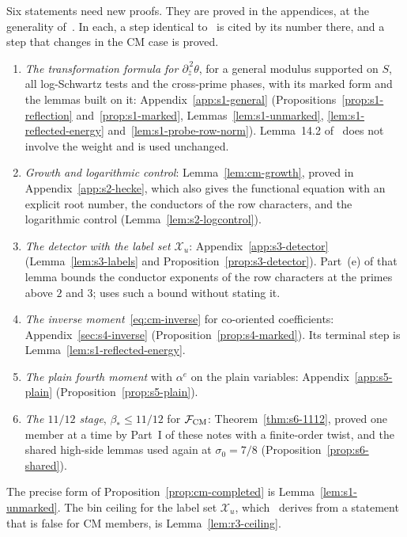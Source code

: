 \documentclass[11pt]{article}
\numberwithin{equation}{section}
\begin{document}
Six statements need new proofs. They are proved in the appendices, at the generality of~\cite{OAI78}. In each, a step identical to~\cite{OAI78} is cited by its number there, and a
step that changes in the CM case is proved.
\begin{enumerate}
\item \emph{The transformation formula for $\partial_{\bar z}^{\,2}\theta$}, for a general modulus supported on $S$,
 all log-Schwartz tests and the cross-prime phases, with its marked form and the lemmas built on it:
 Appendix~\ref{app:s1-general} (Propositions~\ref{prop:s1-reflection} and~\ref{prop:s1-marked},
 Lemmas~\ref{lem:s1-unmarked}, \ref{lem:s1-reflected-energy} and~\ref{lem:s1-probe-row-norm}).
 Lemma~14.2 of~\cite{OAI78} does not involve the weight and is used unchanged.
\item \emph{Growth and logarithmic control}: Lemma~\ref{lem:cm-growth}, proved in Appendix~\ref{app:s2-hecke}, which
 also gives the functional equation with an explicit root number, the conductors of the row characters, and the
 logarithmic control (Lemma~\ref{lem:s2-logcontrol}).
\item \emph{The detector with the label set $\mathcal X_u$}: Appendix~\ref{app:s3-detector}
 (Lemma~\ref{lem:s3-labels} and Proposition~\ref{prop:s3-detector}). Part~(e) of that lemma bounds the conductor
 exponents of the row characters at the primes above $2$ and $3$; \cite{OAI78} uses such a bound without stating
 it.
\item \emph{The inverse moment}~\eqref{eq:cm-inverse} for co-oriented coefficients: Appendix~\ref{sec:s4-inverse}
 (Proposition~\ref{prop:s4-marked}). Its terminal step is Lemma~\ref{lem:s1-reflected-energy}.
\item \emph{The plain fourth moment} with $\alpha^e$ on the plain variables: Appendix~\ref{app:s5-plain}
 (Proposition~\ref{prop:s5-plain}).
\item \emph{The $11/12$ stage}, $\beta_*\le11/12$ for $\mathcal F_{\rm CM}$: Theorem~\ref{thm:s6-1112}, proved one
 member at a time by Part~I of these notes with a finite-order twist, and the shared high-side lemmas used again
 at $\sigma_0=7/8$ (Proposition~\ref{prop:s6-shared}).
\end{enumerate}
The precise form of Proposition~\ref{prop:cm-completed} is Lemma~\ref{lem:s1-unmarked}. The bin ceiling for the
label set $\mathcal X_u$, which~\cite{OAI78} derives from a statement that is false for CM members, is
Lemma~\ref{lem:r3-ceiling}.
\end{document}
